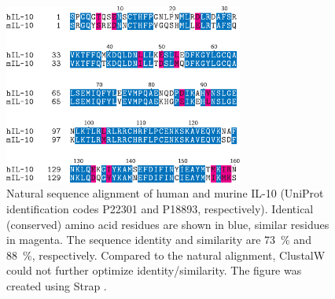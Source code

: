 \begin{figure}
\centering
\includegraphics[width=0.7\textwidth]{gfx/background/murine_human_Il10_alignment_01.pdf}
\caption[]{
Natural sequence alignment of human and murine IL-10 (UniProt
\cite{TheUniProtConsortium01012014} identification codes P22301 and P18893,
respectively). Identical (conserved) amino acid residues are shown in blue,
similar residues in magenta. The sequence identity and similarity are
\SI{73}{\percent} and \SI{88}{\percent}, respectively. Compared to the natural
alignment, ClustalW \cite{clustalw_2008} could not further optimize
identity/similarity. The figure was created using Strap \cite{strap_website}.}
\label{fig:bg:murine_human_il10_sequence}
\end{figure}


